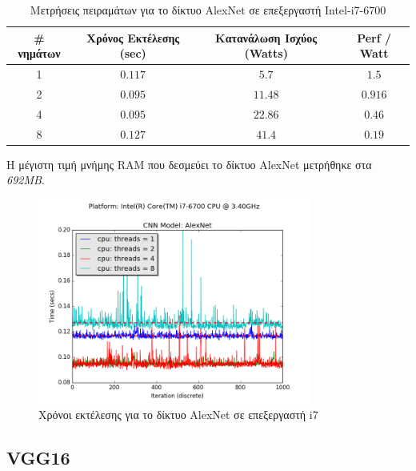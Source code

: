 \begin{table}[H]
  \begin{center}
    \caption{Μετρήσεις πειραμάτων για το δίκτυο AlexNet σε επεξεργαστή Intel-i7-6700}
    \label{tab:alexnet_i7}
    \begin{tabular}{ | c | c | c | c | }
      \hline
      \rowcolor{Gray}
      \# νημάτων & Χρόνος Εκτέλεσης (sec) & Κατανάλωση Ισχύος (Watts) & Perf / Watt \\
      \hline
      1 & $0.117$ & $5.7$ & $1.5$ \\
      2 & $0.095$ & $11.48$ & $0.916$ \\
      4 & $0.095$ & $22.86$ & $0.46$ \\
      8 & $0.127$ & $41.4$ & $0.19$ \\
      \hline
    \end{tabular}
  \end{center}
\end{table}

Η μέγιστη τιμή μνήμης RAM που δεσμεύει το δίκτυο AlexNet μετρήθηκε στα \emph{692MB}.
\newpage

\begin{figure}[H]
  \centering
  \includegraphics[width=0.8\textwidth]{./images/chapter6/benchmark_alexnet_i7.png}
  \caption[Χρόνoι εκτέλεσης για το δίκτυο AlexNet σε επεξεργαστή i7]{Χρόνοι εκτέλεσης για το δίκτυο AlexNet σε επεξεργαστή i7}
  \label{fig:alexnet_results_i7}
\end{figure}




\subsection{VGG16}

